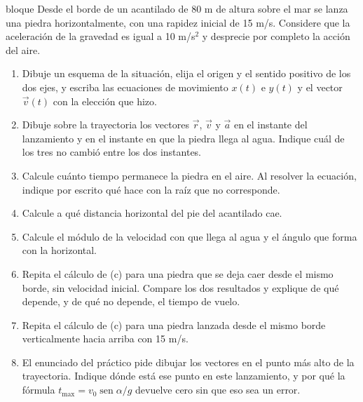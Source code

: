\documentclass[11pt,openany]{book}
\newcommand{\sen}{\operatorname{sen}}
\begin{document}
\begin{ejercicio}{bloque}
Desde el borde de un acantilado de 80 m de altura sobre el mar se lanza una piedra horizontalmente, con una rapidez inicial de 15 m/s. Considere que la aceleración de la gravedad es igual a 10 m/s$^2$ y desprecie por completo la acción del aire.
\begin{enumerate}[label=(\alph*), leftmargin=1.7em, itemsep=1pt, topsep=3pt]
  \item Dibuje un esquema de la situación, elija el origen y el sentido positivo de los dos ejes, y escriba las ecuaciones de movimiento $x(t)$ e $y(t)$ y el vector $\vec v(t)$ con la elección que hizo.
  \item Dibuje sobre la trayectoria los vectores $\vec r$, $\vec v$ y $\vec a$ en el instante del lanzamiento y en el instante en que la piedra llega al agua. Indique cuál de los tres no cambió entre los dos instantes.
  \item Calcule cuánto tiempo permanece la piedra en el aire. Al resolver la ecuación, indique por escrito qué hace con la raíz que no corresponde.
  \item Calcule a qué distancia horizontal del pie del acantilado cae.
  \item Calcule el módulo de la velocidad con que llega al agua y el ángulo que forma con la horizontal.
  \item Repita el cálculo de (c) para una piedra que se deja caer desde el mismo borde, sin velocidad inicial. Compare los dos resultados y explique de qué depende, y de qué no depende, el tiempo de vuelo.
  \item Repita el cálculo de (c) para una piedra lanzada desde el mismo borde verticalmente hacia arriba con 15 m/s.
  \item El enunciado del práctico pide dibujar los vectores en el punto más alto de la trayectoria. Indique dónde está ese punto en este lanzamiento, y por qué la fórmula $t_{\max} = v_0\sen\alpha/g$ devuelve cero sin que eso sea un error.
\end{enumerate}
\end{ejercicio}
\end{document}
